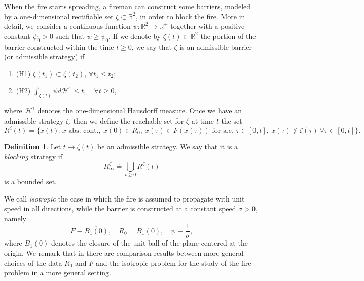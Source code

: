 \documentclass[reqno]{amsart}
\newcounter{assu}
\theoremstyle{definition} \newtheorem{definition}{Definition}[section]
\theoremstyle{definition} \newtheorem{remark}[definition]{Remark}
\theoremstyle{plain} \newtheorem{lemma}[definition]{Lemma}
\theoremstyle{plain} \newtheorem{proposition}[definition]{Proposition}
\theoremstyle{plain} \newtheorem{theorem}[definition]{Theorem}
\theoremstyle{plain} \newtheorem{corollary}[definition]{Corollary}
\theoremstyle{definition} \newtheorem{example}[definition]{Example}
\theoremstyle{plain} \newtheorem{claim}[clai]{Claim}
\theoremstyle{definition} \newtheorem{assumption}[definition]{Assumption}
\theoremstyle{definition} \newtheorem{observation}[definition]{Observation}
\newcommand{\R}{\mathbb{R}}
\newcommand{\1}{\mathbbm 1}
\renewcommand{\H}{\mathscr H}
\numberwithin{equation}{section} %
\theoremstyle{plain} \newtheorem*{theorem*}{Theorem}
\theoremstyle{plain} \newtheorem{mthm}[maintheorem]{Main Theorem}
\theoremstyle{plain} \newtheorem*{mthm*}{Main Theorem}
\theoremstyle{plain} \newtheorem*{conjecture*}{Conjecture}
\theoremstyle{plain} \newtheorem{conjecture}[definition]{Conjecture}
\theoremstyle{plain} \newtheorem*{problem*}{Problem}
\begin{document}
When the fire starts spreading, a fireman can construct some barriers, modeled by a one-dimensional rectifiable set $\zeta\subset\R^2$, in order to block the fire. More in detail, we consider a continuous function $\psi: \R^2 \rightarrow \R^+$ together with a positive constant $\psi_0>0$ such that $\psi\geq\psi_0$. If we denote by $\zeta(t)\subset\R^2$ the portion of the barrier constructed within the time $t\geq 0$, we say that  $\zeta$ is an admissible barrier (or admissible strategy) if
\begin{enumerate}
\item{(H1)}%
$\zeta(t_1)\subset \zeta(t_2)$, $\forall  t_1\leq t_2$;
\item{(H2)}%
$\int_{\zeta(t)}\psi d\H^1\leq t,\quad \forall t\geq 0$,
\end{enumerate}
where $\H^1$ denotes the one-dimensional Hausdorff measure. Once we have an admissible strategy $\zeta$, then we define the reachable set for $\zeta$ at time $t$ the set
\begin{equation*}%
R^\zeta(t) = \Big\lbrace x(t): x\text{ abs. cont.},\ x(0) \in R_0, \ \dot x(\tau)\in F(x(\tau))\text{ for a.e. } \tau\in[0,t],\ x(\tau)\not\in\zeta(\tau) \ \forall\tau\in[0,t] \Big\rbrace.
\end{equation*}

\begin{definition}
Let $t\rightarrow\zeta(t)$ be an admissible strategy. We say that it is a \emph{blocking} strategy if
\begin{equation*}
R^\zeta_\infty\doteq\bigcup_{t\geq 0} R^\zeta(t)
\end{equation*}
is a bounded set.
\end{definition}

We call \emph{isotropic} the case in which the fire is assumed to propagate with unit speed in all directions, while the barrier is constructed at a constant speed $\sigma>0$, namely
\begin{equation}
\label{isotropic case}
F \equiv \overline{B_1(0)},\quad R_0=B_1(0), \quad \psi\equiv\frac{1}{\sigma},
\end{equation}
where $\overline{B_1(0)}$ denotes the closure of the unit ball of the plane centered at the origin. We remark that in \cite{Bressan_friends} there are comparison results between more general choices of the data $R_0$ and $F$ and the isotropic problem for the study of the fire problem in a more general setting.
\end{document}
